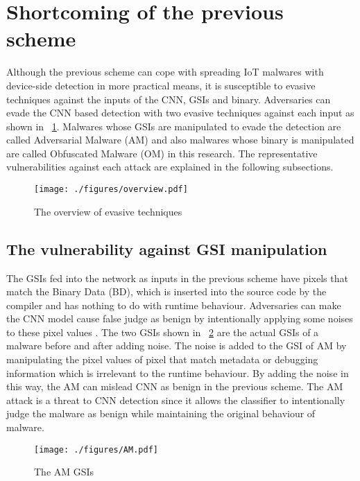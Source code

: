 \section{Shortcoming of the previous scheme } 
Although the previous scheme can cope with spreading IoT malwares with device-side detection in more practical means, it is susceptible to evasive techniques against the inputs of the CNN, GSIs and binary.
Adversaries can evade the CNN based detection with two evasive techniques against each input as shown in \figurename~\ref{fig:ov}.
Malwares whose GSIs are manipulated to evade the detection are called Adversarial Malware (AM) and also malwares whose binary is manipulated are called Obfuscated Malware (OM) in this research.  
The representative vulnerabilities against each attack are explained in the following subsections.

\begin{figure}[p]
 \centering
 \hspace{-55pt}
 \texttt{[image: ./figures/overview.pdf]}
 \caption{The overview of evasive techniques} 
 \label{fig:ov}
\end{figure}
\afterpage{\clearpage}
\newpage

\subsection{The vulnerability against GSI manipulation}
The GSIs fed into the network as inputs in the previous scheme have pixels that match the Binary Data (BD), which is inserted into the source code by the compiler and has nothing to do with runtime behaviour.
Adversaries can make the CNN model cause false judge as benign by intentionally applying some noises to these pixel values \cite{AM}.
The two GSIs shown in \figurename~\ref{fig:amGSI} are the actual GSIs of a malware before and after adding noise.
The noise is added to the GSI of AM by manipulating the pixel values of pixel that match metadata or debugging information which is irrelevant to the runtime behaviour.
By adding the noise in this way, the AM can mislead CNN as benign in the previous scheme.
The AM attack is a threat to CNN detection since it allows the classifier to intentionally judge the malware as benign while maintaining the original behaviour of malware.

\begin{figure}[p]
 \centering
 \hspace{-55pt}
 \texttt{[image: ./figures/AM.pdf]}
 \caption{The AM GSIs} 
 \label{fig:amGSI}
\end{figure}
\afterpage{\clearpage}
\newpage
